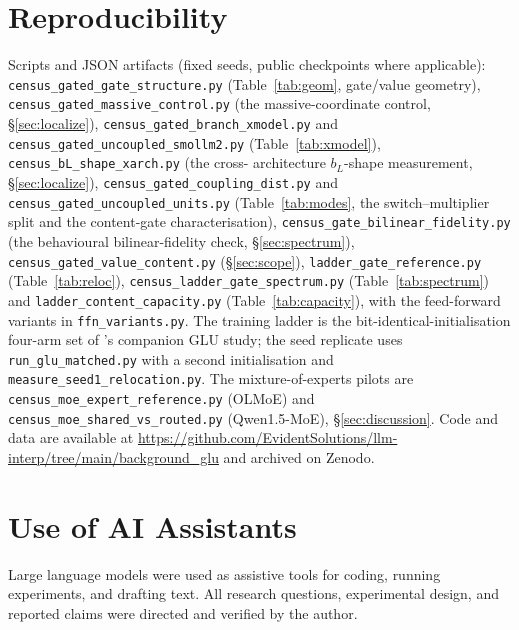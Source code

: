 \documentclass[11pt]{article}
\newcommand{\bl}{b_L}
\begin{document}
\section*{Reproducibility}
{\raggedright
Scripts and JSON artifacts (fixed seeds, public checkpoints where applicable):
\texttt{census\_gated\_gate\_structure.py} (Table~\ref{tab:geom}, gate/value
geometry), \texttt{census\_gated\_massive\_control.py} (the massive-coordinate control,
\S\ref{sec:localize}), \texttt{census\_gated\_branch\_xmodel.py} and
\texttt{census\_gated\_uncoupled\_smollm2.py} (Table~\ref{tab:xmodel}),
\texttt{census\_bL\_shape\_xarch.py} (the cross-%
architecture $\bl$-shape measurement, \S\ref{sec:localize}),
\texttt{census\_gated\_coupling\_dist.py} and
\texttt{census\_gated\_uncoupled\_units.py} (Table~\ref{tab:modes}, the
switch--multiplier split and the content-gate characterisation),
\texttt{census\_gate\_bilinear\_fidelity.py} (the behavioural bilinear-fidelity
check, \S\ref{sec:spectrum}),
\texttt{census\_gated\_value\_content.py} (\S\ref{sec:scope}),
\texttt{ladder\_gate\_reference.py} (Table~\ref{tab:reloc}),
\texttt{census\_ladder\_gate\_spectrum.py} (Table~\ref{tab:spectrum}) and
\texttt{ladder\_content\_capacity.py} (Table~\ref{tab:capacity}), with the
feed-forward variants in \texttt{ffn\_variants.py}. The training ladder is the
bit-identical-initialisation four-arm set of \citet{tuomi2026background}'s
companion GLU study; the seed replicate uses \texttt{run\_glu\_matched.py} with a
second initialisation and \texttt{measure\_seed1\_relocation.py}. The
mixture-of-experts pilots are \texttt{census\_moe\_expert\_reference.py} (OLMoE)
and \texttt{census\_moe\_shared\_vs\_routed.py} (Qwen1.5-MoE), \S\ref{sec:discussion}.
Code and data are available at
\url{https://github.com/EvidentSolutions/llm-interp/tree/main/background_glu}
and archived on Zenodo.
\par}

\section*{Use of AI Assistants}
Large language models were used as assistive tools for coding, running
experiments, and drafting text. All research questions, experimental design, and
reported claims were directed and verified by the author.



\end{document}
